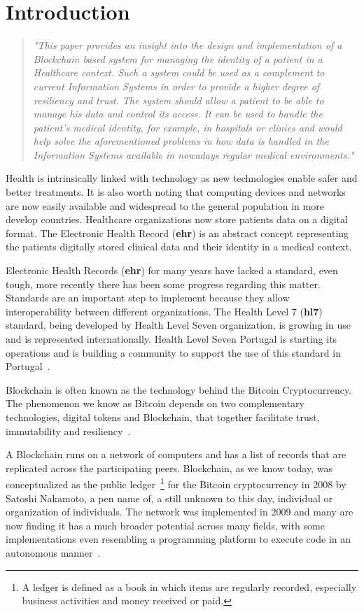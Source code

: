 \chapter{Introduction}\label{introduction}

\begin{quote} \emph{"This paper provides an insight into the design and
  implementation of a Blockchain based system for managing the identity of a
  patient in a Healthcare context. Such a system could be used as a complement
  to current Information Systems in order to provide a higher degree of
  resiliency and trust. The system should allow a patient to be able to manage
  his data and control its access. It can be used to handle the patient’s
  medical identity, for example, in hospitals or clinics and would help solve
the aforementioned problems in how data is handled in the Information Systems
available in nowadays regular medical environments."} \end{quote}

Health is intrinsically linked with technology as new technologies enable safer
and better treatments. It is also worth noting that computing devices and
networks are now easily available and widespread to the general population in
more develop countries. Healthcare organizations now store patients data on a
digital format. The Electronic Health Record (\textbf{ehr}) is an abstract
concept representing the patients digitally stored clinical data and their
identity in a medical context.

Electronic Health Records (\textbf{ehr}) for many years have lacked a standard,
even tough, more recently there has been some progress regarding this matter.
Standards are an important step to implement because they allow
interoperability between different organizations. The Health Level 7
(\textbf{hl7}) standard, being developed by Health Level Seven organization, is
growing in use and is represented internationally. Health Level Seven Portugal
is starting its operations and is building a community to support the use of
this standard in Portugal~\cite{HealthLevel7}.

Blockchain is often known as the technology behind the Bitcoin Cryptocurrency.
The phenomenon we know as Bitcoin depends on two complementary technologies,
digital tokens and Blockchain, that together facilitate trust, immutability and
resiliency~\cite{Evans2016}.

A Blockchain runs on a network of computers and has a list of records that are
replicated across the participating peers. Blockchain, as we know today, was
conceptualized as the public ledger~\footnote{A ledger is defined as a book in
which items are regularly recorded, especially business activities and money
received or paid.} for the Bitcoin cryptocurrency in 2008 by Satoshi Nakamoto,
a pen name of, a still unknown to this day, individual or organization of
individuals. The network was implemented in 2009 and many are now finding it
has a much broader potential across many fields, with some implementations even
resembling a programming platform to execute code in an autonomous
manner~\cite{Nakamoto2008}.

